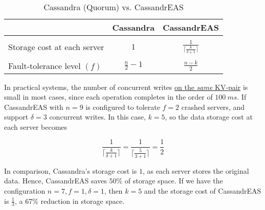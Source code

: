 \begin{table}[h]
	\centering
	\begin{tabular}{ l|c|c}
		& Cassandra &  CassandrEAS  \\ \hline
		&&\\[-0.8em]
		Storage cost at each server & $1$ &  $\frac{1}{ \lceil\frac{k}{\delta+1}\rceil}$  \\
		&&\\[-0.8em]\hline
		Fault-tolerance level $(f)$& $\frac{n}{2} - 1$     &  $\frac{n-k}{2}$  \\%
	\end{tabular}
	\caption{Cassandra (Quorum) vs. CassandrEAS}
	\label{t:comparison}
\end{table}

In practical systems, the number of concurrent writes \underline{on the \textit{same} KV-pair} is small in most cases, since each operation completes in the order of $100~ms$. If CassandrEAS with $n=9$ is configured to tolerate $f=2$ crashed servers, and support $\delta = 3$ concurrent writes. In this case, $k = 5$, so the data storage cost at each server becomes

\[
\frac{1}{ \lceil\frac{k}{\delta+1}\rceil} = \frac{1}{ \lceil\frac{5}{3+1}\rceil} = \frac{1}{2}
\]

In comparison, Cassandra's storage cost is $1$, as each server stores the original data. Hence, CassandrEAS saves $50 \%$ of storage space. If we have the configuration $n=7, f=1, \delta=1$, then $k=5$ and the storage cost of CassandrEAS is $\frac{1}{3}$, a $67\%$ reduction in storage space.






